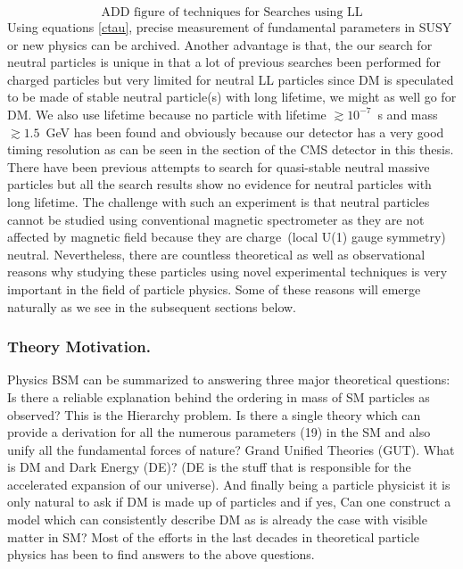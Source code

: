 {\begin{equation}
\mbox{ADD figure of techniques for Searches using LL}
\end{equation}
Using equations \eqref{ctau}, precise measurement of fundamental parameters in SUSY or new physics can be archived.
Another advantage is that, the our search for neutral particles  is unique in that a lot of previous searches been performed for charged particles but very limited for neutral LL particles since DM is speculated to be made of stable neutral particle(s) with long lifetime, we might as well go for DM. 
We also use lifetime because no particle with lifetime $\gtrsim10^{-7}$~s and mass $\gtrsim 1.5$~GeV has been found and obviously because our detector has a very good timing resolution as can be seen in the section of the CMS detector in this thesis.
\newline{}
There have been previous attempts to search for quasi-stable neutral massive particles but all the search results show no evidence for neutral particles with long lifetime.  
The challenge with such an experiment is that neutral particles cannot be studied using conventional magnetic spectrometer as they are not affected by magnetic field because they are charge~(local 
U(1) gauge symmetry) neutral.
Nevertheless, there are countless theoretical as well as observational reasons why studying these particles using novel experimental techniques is very important in the field of particle physics. 
Some of these reasons will emerge naturally as we see in the subsequent sections below.
\subsubsection{Theory Motivation.}
Physics BSM can be summarized to answering three major theoretical questions:  Is there a reliable explanation  
behind the ordering in mass of SM particles as observed? This is the Hierarchy problem.
Is there a single theory which can provide a derivation for all the 
numerous parameters (19) in the SM and also unify all the fundamental forces of nature? Grand Unified Theories (GUT). 
What is DM and Dark Energy (DE)?
(DE is the stuff that is responsible for the accelerated expansion of our universe).
And finally being a particle physicist it is only natural to ask if DM is made up of particles and if yes,
Can one construct a model which can consistently describe DM as is already the case with visible matter in SM?
\newline
Most of the efforts in the last decades in theoretical particle physics has been to find answers to the above questions.
}
